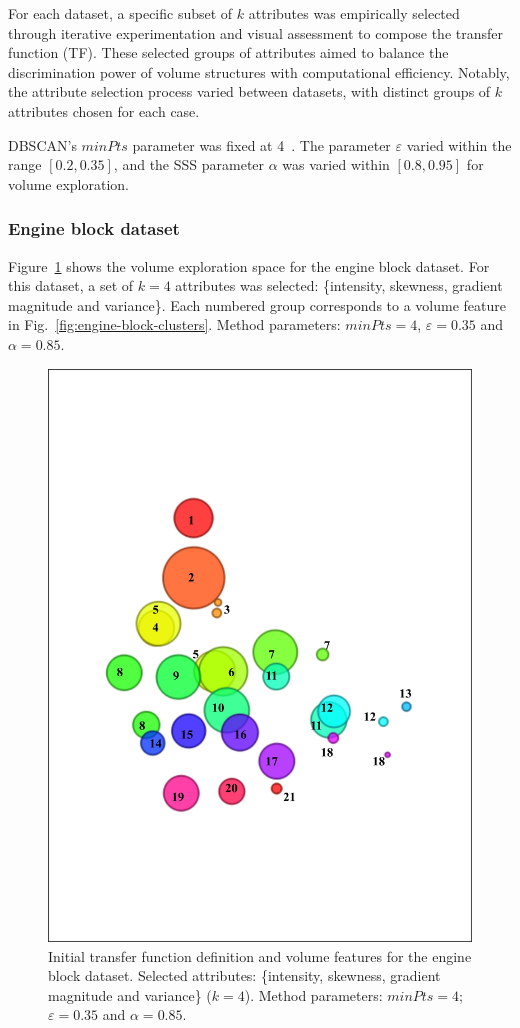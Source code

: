 For each dataset, a specific subset of \(k\) attributes was empirically selected through iterative experimentation and visual assessment to compose the transfer function (TF). These selected groups of attributes aimed to balance the discrimination power of volume structures with computational efficiency. Notably, the attribute selection process varied between datasets, with distinct groups of \(k\) attributes chosen for each case.

DBSCAN's $minPts$ parameter was fixed at 4~\cite{ester1996}. The parameter $\varepsilon$ varied within the range $[0.2, 0.35]$, and the SSS parameter $\alpha$ was varied within $[0.8, 0.95]$ for volume exploration.

\subsubsection{Engine block dataset}
\label{subsubsec:engine-block}

Figure~\ref{fig:engine-block-clusters-tf} shows the volume exploration space for the engine block dataset. For this dataset, a set of \(k = 4\) attributes was selected: \{intensity, skewness, gradient magnitude and variance\}. Each numbered group corresponds to a volume feature in Fig.~\ref{fig:engine-block-clusters}. Method parameters: $minPts=4$, $\varepsilon=0.35$ and $\alpha=0.85$.

\begin{figure}[htb!]
    \centering
    \includegraphics[width=0.7\columnwidth]{figs/engine-block-clusters-tf.jpg}
    \caption{Initial transfer function definition and volume features for the engine block dataset. Selected attributes: \{intensity, skewness, gradient magnitude and variance\} (\(k=4\)). Method parameters: $minPts=4$; $\varepsilon=0.35$ and $\alpha=0.85$.}
    \label{fig:engine-block-clusters-tf}
\end{figure}

